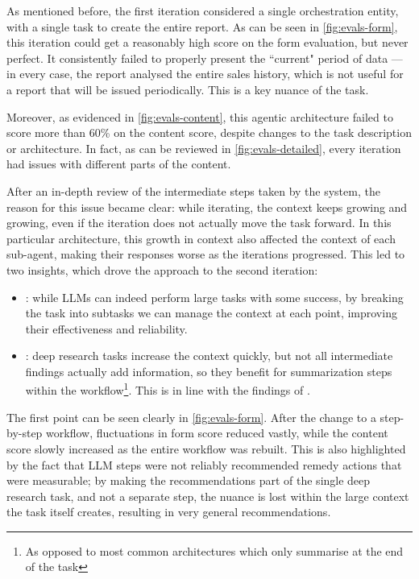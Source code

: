 \documentclass[a4paper]{report}
\begin{document}
As mentioned before, the first iteration considered a single orchestration entity, with a single task to create the entire report. As can be seen in \autoref{fig:evals-form}, this iteration could get a reasonably high score on the form evaluation, but never perfect. It consistently failed to properly present the ``current" period of data --- in every case, the report analysed the entire sales history, which is not useful for a report that will be issued periodically. This is a key nuance of the task.

Moreover, as evidenced in \autoref{fig:evals-content}, this agentic architecture failed to score more than 60\% on the content score, despite changes to the task description or architecture. In fact, as can be reviewed in \autoref{fig:evals-detailed}, every iteration had issues with different parts of the content.

After an in-depth review of the intermediate steps taken by the system, the reason for this issue became clear: while iterating, the context keeps growing and growing, even if the iteration does not actually move the task forward. In this particular architecture, this growth in context also affected the context of each sub-agent, making their responses worse as the iterations progressed. This led to two insights, which drove the approach to the second iteration:

\begin{itemize}
    \item {}\kfid : while LLMs can indeed perform large tasks with some success, by breaking the task into subtasks we can manage the context at each point, improving their effectiveness and reliability.
    \item {}\kfid : deep research tasks increase the context quickly, but not all intermediate findings actually add information, so they benefit for summarization steps within the workflow\footnote{As opposed to most common architectures which only summarise at the end of the task}. This is in line with the findings of \cite{veseli2025positionalbiasesshiftinputs}.
\end{itemize}

The first point can be seen clearly in \autoref{fig:evals-form}. After the change to a step-by-step workflow, fluctuations in form score reduced vastly, while the content score slowly increased as the entire workflow was rebuilt. This is also highlighted by the fact that LLM steps were not reliably recommended remedy actions that were measurable; by making the recommendations part of the single deep research task, and not a separate step, the nuance is lost within the large context the task itself creates, resulting in very general recommendations.
\end{document}

